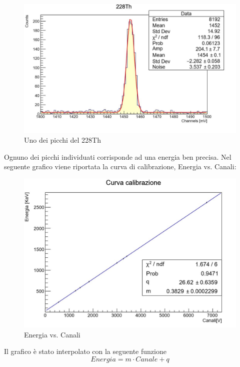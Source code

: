 \documentclass[a4paper,10pt]{article}
\begin{document}
\begin{figure}[H]
    \centering
    \includegraphics[scale=0.45]{grafici/piccoTh}
    \caption{Uno dei picchi del 228Th}
\end{figure}

Ognuno dei picchi individuati corrisponde ad una energia ben precisa. Nel seguente grafico viene riportata la curva di calibrazione, Energia vs. Canali:

\begin{figure}[H]
    \centering
    \includegraphics[scale=0.45]{grafici/rettacalibrazionesources}
    \caption{Energia vs. Canali}
\end{figure}

Il grafico \`e stato interpolato con la seguente funzione 
\begin{equation}
	Energia=m\cdot Canale + q
\end{equation}
\end{document}
